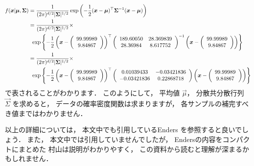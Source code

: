\documentclass[a4j]{jarticle}\usepackage[]{graphicx}\usepackage[]{color}
\begin{document}
\begin{align}
f(\mbox{\boldmath $x$} | \mbox{\boldmath $\mu$}, \mbox{\boldmath $\Sigma$})
&= \frac{1}{(2\pi)^{d/2}|\mbox{\boldmath $\Sigma$}|^{1/2}} 
   \exp{\left(
     -\frac{1}{2}
     (\mbox{\boldmath $x$} - \mbox{\boldmath $\mu$})^{\top}
     \mbox{\boldmath $\Sigma$}^{-1}
     (\mbox{\boldmath $x$} - \mbox{\boldmath $\mu$})
   \right)} \\
&= \frac{1}{(2\pi)^{d/2}|\mbox{\boldmath $\Sigma$}|^{1/2}} \times \nonumber \\
&\, \, \, 
   \exp{\left\{
     -\frac{1}{2}
     \left(
                 \mbox{\boldmath $x$} -
                 \left(
                   \begin{array}{c}
										99.99989 \\
                    9.84867
                   \end{array}
                 \right)
                \right)^{\top}
    \left(
      \begin{array}{cc}
      189.60050 & 28.369839 \\
      28.36984 & 8.617752
      \end{array}
    \right)^{-1}
		\left(
       \mbox{\boldmath $x$} -
       \left(
         \begin{array}{c}
					99.99989 \\
          9.84867
         \end{array}
       \right)
    \right)
  \right\}} \\
&= \frac{1}{(2\pi)^{d/2}|\mbox{\boldmath $\Sigma$}|^{1/2}} \times \nonumber \\
&\, \, \, 
   \exp{\left\{
     -\frac{1}{2}
     \left(
                 \mbox{\boldmath $x$} -
                 \left(
                   \begin{array}{c}
										99.99989 \\
                    9.84867
                   \end{array}
                 \right)
                \right)^{\top}
    \left(
      \begin{array}{cc}
      0.01039433 & -0.03421836 \\
      -0.03421836 & 0.22868718
      \end{array}
    \right)
		\left(
       \mbox{\boldmath $x$} -
       \left(
         \begin{array}{c}
					99.99989 \\
          9.84867
         \end{array}
       \right)
    \right)
  \right\}} 
\end{align}
で表されることがわかります．
このようにして，
平均値 $\vec{\mu}$，
分散共分散行列 $\vec{\Sigma}$ を求めると，
データの確率密度関数は求まりますが，
各サンプルの補完すべき値まではわかりません．

以上の詳細については，
本文中でも引用しているEnders\cite{Enders2010}
を参照すると良いでしょう．
また，
本文中では引用していませんでしたが，
Enders\cite{Enders2010}の内容をコンパクトにまとめた
村山\cite{Murayama2011}は説明がわかりやすく，
この資料から読むと理解が深まるかもしれません．


\end{document}
